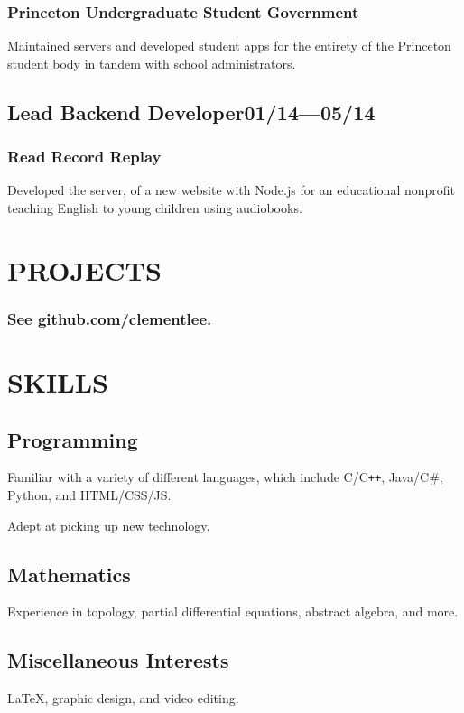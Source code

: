 \documentclass[11pt]{article}
\begin{document}
\begin{multicols}{2}
\subsubsection*{Princeton Undergraduate Student Government}
Maintained servers and developed student apps for the entirety of the Princeton student body in tandem with school administrators.

\subsection*{Lead Backend Developer\hfill\textnormal{01/14---05/14}}
\subsubsection*{Read Record Replay}
Developed the server, of a new website with Node.js for an educational nonprofit teaching English to young children using audiobooks.

\section*{PROJECTS}
\vspace{-0.5\baselineskip}
\subsubsection*{See github.com/clementlee.}

\vspace{2\baselineskip}


\section*{SKILLS}

\subsection*{Programming}
Familiar with a variety of different languages, which include C/C{}\verb!++!, Java/C\#, Python, and HTML/CSS/JS.

Adept at picking up new technology.

\subsection*{Mathematics}
Experience in topology, partial differential equations, abstract algebra, and more.

\subsection*{Miscellaneous Interests}
LaTeX, graphic design, and video editing.

\end{multicols}
\end{document}
